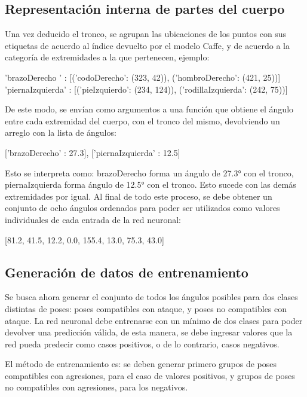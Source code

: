 \documentclass[a4paper,12pt,oneside,spanish]{book}
\begin{document}
\subsection{Representación interna de partes del cuerpo}
Una vez deducido el tronco, se agrupan las ubicaciones de los puntos con sus etiquetas de acuerdo al índice devuelto por el modelo Caffe, y de acuerdo a la categoría de extremidades a la que pertenecen, ejemplo:
\begin{center}
{\footnotesize 'brazoDerecho  ' : [('codoDerecho': (323, 42)),  ('hombroDerecho': (421, 25))]}  \\
{\footnotesize 'piernaIzquierda' : [('pieIzquierdo': (234, 124)), ('rodillaIzquierda': (242, 75))]}\\	
\end{center}

De este modo, se envían como argumentos a una función que obtiene el ángulo entre cada extremidad del cuerpo, con el tronco del mismo, devolviendo un arreglo con la lista de ángulos:
\begin{center}
	{\footnotesize ['brazoDerecho' : 27.3], ['piernaIzquierda' : 12.5]}\\	
\end{center}
Esto se interpreta como: brazoDerecho forma un ángulo de 27.3° con el tronco, piernaIzquierda forma ángulo de 12.5° con el tronco. Esto sucede con las demás extremidades por igual. Al final de todo este proceso, se debe obtener un conjunto de ocho ángulos ordenados para poder ser utilizados como valores individuales de cada entrada de la red neuronal:
\begin{center}
	{\footnotesize [81.2, 41.5, 12.2, 0.0, 155.4, 13.0, 75.3, 43.0]}\\	
\end{center}

\subsection{Generación de datos de entrenamiento}
Se busca ahora generar el conjunto de todos los ángulos posibles para dos clases distintas de poses: poses compatibles con ataque, y poses no compatibles con ataque. La red neuronal debe entrenarse con un mínimo de dos clases para poder devolver una predicción válida, de esta manera, se debe ingresar valores que la red pueda predecir como casos positivos, o de lo contrario, casos negativos.\par

El método de entrenamiento es: se deben generar primero grupos de poses compatibles con agresiones, para el caso de valores positivos, y grupos de poses no compatibles con agresiones, para los negativos.\par
\end{document}
